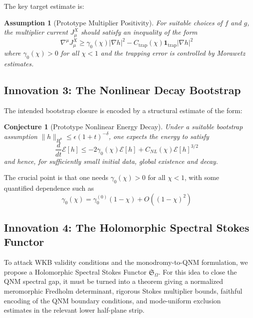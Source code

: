 \documentclass[12pt,a4paper]{article}
\newtheorem{conjecture}[theorem]{Conjecture}
\newtheorem{assumption}[theorem]{Assumption}
\begin{document}
The key target estimate is:
\begin{assumption}[Prototype Multiplier Positivity]
For suitable choices of $f$ and $g$, the multiplier current $J^X_\mu$ should satisfy an inequality of the form
\begin{equation}
\nabla^\mu J^X_\mu \geq \gamma_0(\chi)|\nabla h|^2 - C_{\text{trap}}(\chi)\mathbf{1}_{\text{trap}}|\nabla h|^2
\end{equation}
where $\gamma_0(\chi) > 0$ for all $\chi < 1$ and the trapping error is controlled by Morawetz estimates.
\end{assumption}

\subsection{Innovation 3: The Nonlinear Decay Bootstrap}

The intended bootstrap closure is encoded by a structural estimate of the form:
\begin{conjecture}[Prototype Nonlinear Energy Decay]\label{thm:nonlinear-decay}
Under a suitable bootstrap assumption $\|h\|_{H^8} \leq \epsilon (1+t)^{-\delta}$, one expects the energy to satisfy
\begin{equation}
\frac{d}{dt}\mathcal{E}[h] \leq -2\gamma_0(\chi)\mathcal{E}[h] + C_{NL}(\chi)\mathcal{E}[h]^{3/2}
\end{equation}
and hence, for sufficiently small initial data, global existence and decay.
\end{conjecture}

The crucial point is that one needs $\gamma_0(\chi) > 0$ for all $\chi < 1$, with some quantified dependence such as
\begin{equation}
\gamma_0(\chi) = \gamma_0^{(0)}(1-\chi) + O((1-\chi)^2)
\end{equation}

\subsection{Innovation 4: The Holomorphic Spectral Stokes Functor}

To attack WKB validity conditions and the monodromy-to-QNM formulation, we propose a Holomorphic Spectral Stokes Functor $\mathfrak{S}_{\Omega}$. For this idea to close the QNM spectral gap, it must be turned into a theorem giving a normalized meromorphic Fredholm determinant, rigorous Stokes multiplier bounds, faithful encoding of the QNM boundary conditions, and mode-uniform exclusion estimates in the relevant lower half-plane strip.
\end{document}
